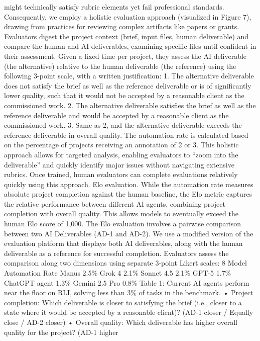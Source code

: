 might technically satisfy rubric elements yet fail professional standards. Consequently, we employ a
holistic evaluation approach (visualized in Figure 7), drawing from practices for reviewing complex
artifacts like papers or grants. Evaluators digest the project context (brief, input files, human
deliverable) and compare the human and AI deliverables, examining specific files until confident
in their assessment. Given a fixed time per project, they assess the AI deliverable (the alternative)
relative to the human deliverable (the reference) using the following 3-point scale, with a written
justification:
1. The alternative deliverable does not satisfy the brief as well as the reference deliverable or is
of significantly lower quality, such that it would not be accepted by a reasonable client as
the commissioned work.
2. The alternative deliverable satisfies the brief as well as the reference deliverable and would
be accepted by a reasonable client as the commissioned work.
3. Same as 2, and the alternative deliverable exceeds the reference deliverable in overall quality.
The automation rate is calculated based on the percentage of projects receiving an annotation of
2 or 3. This holistic approach allows for targeted analysis, enabling evaluators to “zoom into the
deliverable” and quickly identify major issues without navigating extensive rubrics. Once trained,
human evaluators can complete evaluations relatively quickly using this approach.
Elo evaluation.
While the automation rate measures absolute project completion against the human
baseline, the Elo metric captures the relative performance between different AI agents, combining
project completion with overall quality. This allows models to eventually exceed the human Elo score
of 1,000. The Elo evaluation involves a pairwise comparison between two AI Deliverables (AD-1
and AD-2). We use a modified version of the evaluation platform that displays both AI deliverables,
along with the human deliverable as a reference for successful completion.
Evaluators assess the comparison along two dimensions using separate 3-point Likert scales:
8
Model
Automation Rate
Manus
2.5\%
Grok 4
2.1\%
Sonnet 4.5
2.1\%
GPT-5
1.7\%
ChatGPT agent
1.3\%
Gemini 2.5 Pro
0.8\%
Table 1: Current AI agents perform near the floor on RLI, solving less than 3\% of tasks in the
benchmark.
• Project completion: Which deliverable is closer to satisfying the brief (i.e., closer to a state
where it would be accepted by a reasonable client)? (AD-1 closer / Equally close / AD-2
closer)
• Overall quality: Which deliverable has higher overall quality for the project? (AD-1 higher
